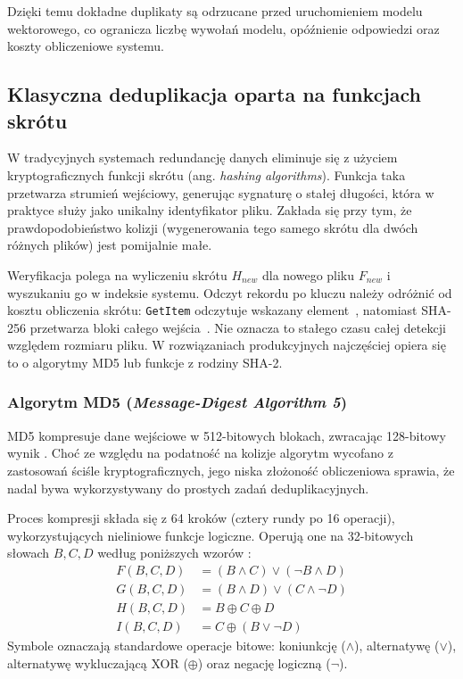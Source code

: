 Dzięki temu dokładne duplikaty są odrzucane przed uruchomieniem modelu wektorowego, co ogranicza liczbę wywołań modelu, opóźnienie odpowiedzi oraz koszty obliczeniowe systemu.




\subsection{Klasyczna deduplikacja oparta na funkcjach skrótu}


W tradycyjnych systemach redundancję danych eliminuje się z użyciem kryptograficznych funkcji skrótu (ang. \textit{hashing algorithms}). Funkcja taka przetwarza strumień wejściowy, generując sygnaturę o stałej długości, która w praktyce służy jako unikalny identyfikator pliku. Zakłada się przy tym, że prawdopodobieństwo kolizji (wygenerowania tego samego skrótu dla dwóch różnych plików) jest pomijalnie małe.


Weryfikacja polega na wyliczeniu skrótu $H_{new}$ dla nowego pliku $F_{new}$ i wyszukaniu go w indeksie systemu. Odczyt rekordu po kluczu należy odróżnić od kosztu obliczenia skrótu: \texttt{GetItem} odczytuje wskazany element~\cite{awsGetItem}, natomiast SHA-256 przetwarza bloki całego wejścia~\cite{shs2015}. Nie oznacza to stałego czasu całej detekcji względem rozmiaru pliku. W rozwiązaniach produkcyjnych najczęściej opiera się to o algorytmy MD5 lub funkcje z rodziny SHA-2.


\subsubsection{Algorytm MD5 (\textit{Message-Digest Algorithm 5})}


MD5 kompresuje dane wejściowe w 512-bitowych blokach, zwracając 128-bitowy wynik \cite{rfc1321}. Choć ze względu na podatność na kolizje algorytm wycofano z zastosowań ściśle kryptograficznych, jego niska złożoność obliczeniowa sprawia, że nadal bywa wykorzystywany do prostych zadań deduplikacyjnych.


Proces kompresji składa się z 64 kroków (cztery rundy po 16 operacji), wykorzystujących nieliniowe funkcje logiczne. Operują one na 32-bitowych słowach $B, C, D$ według poniższych wzorów \cite{rfc1321}:
\begin{align}
    F(B, C, D) & = (B \wedge C) \vee (\neg B \wedge D) \\
    G(B, C, D) & = (B \wedge D) \vee (C \wedge \neg D) \\
    H(B, C, D) & = B \oplus C \oplus D \\
    I(B, C, D) & = C \oplus (B \vee \neg D)
\end{align}
Symbole oznaczają standardowe operacje bitowe: koniunkcję ($\wedge$), alternatywę ($\vee$), alternatywę wykluczającą XOR ($\oplus$) oraz negację logiczną ($\neg$).


